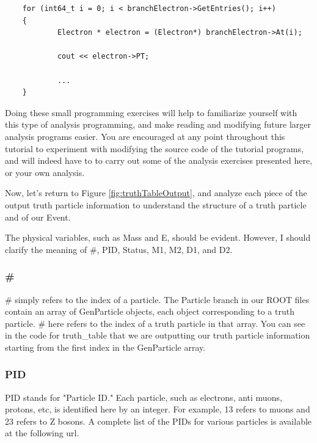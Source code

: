 \documentclass{article}
\begin{document}
\begin{verbatim}
	for (int64_t i = 0; i < branchElectron->GetEntries(); i++)
	{
	        Electron * electron = (Electron*) branchElectron->At(i);

	        cout << electron->PT;

	        ...
	}
\end{verbatim}

Doing these small programming exercises will help to familiarize yourself with this type of
analysis programming, and make reading and modifying future larger analysis programs easier.
You are encouraged at any point throughout this tutorial to experiment with modifying the source
code of the tutorial programs, and will indeed have to to carry out some of the analysis exercises
presented here, or your own analysis.

\bigskip

Now, let's return to Figure \ref{fig:truthTableOutput}, and analyze each piece of the output truth
particle information to understand the structure of a truth particle and of our Event.

\bigskip

The physical variables, such as Mass and E, should be evident. However, I should clarify the
meaning of \#, PID, Status, M1, M2, D1, and D2.

\subsubsection{\#}

\# simply refers to the index of a particle. The Particle branch in our ROOT files contain an
array of GenParticle objects, each object corresponding to a truth particle. \# here refers to
the index of a truth particle in that array. You can see in the code for truth\_table that we
are outputting our truth particle information starting from the first index in the GenParticle array.

\subsubsection{PID}

PID stands for "Particle ID." Each particle, such as electrons, anti muons, protons, etc, is
identified here by an integer. For example, 13 refers to muons and 23 refers to Z bosons. A
complete list of the PIDs for various particles is available at the following url.

\bigskip
\end{document}
